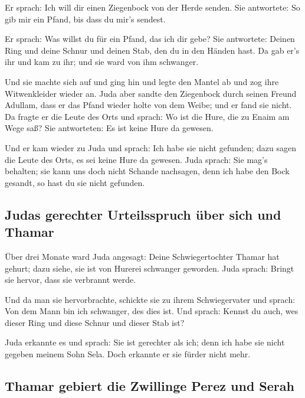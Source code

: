  Er sprach: Ich will dir einen Ziegenbock von der Herde
senden. Sie antwortete: So gib mir ein Pfand, bis dass du mir's sendest.

 Er sprach: Was willst du für ein Pfand, das ich dir
gebe? Sie antwortete: Deinen Ring und deine Schnur und deinen Stab, den
du in den Händen hast. Da gab er's ihr und kam zu ihr; und sie ward von
ihm schwanger.

 Und sie machte sich auf und ging hin und legte den
Mantel ab und zog ihre Witwenkleider wieder an.  Juda
aber sandte den Ziegenbock durch seinen Freund Adullam, dass er das
Pfand wieder holte von dem Weibe; und er fand sie nicht. 
Da fragte er die Leute des Orts und sprach: Wo ist die Hure, die zu
Enaim am Wege saß? Sie antworteten: Es ist keine Hure da gewesen.

 Und er kam wieder zu Juda und sprach: Ich habe sie nicht
gefunden; dazu sagen die Leute des Orts, es sei keine Hure da gewesen.
 Juda sprach: Sie mag's behalten; sie kann uns doch nicht
Schande nachsagen, denn ich habe den Bock gesandt, so hast du sie nicht
gefunden.

\hypertarget{judas-gerechter-urteilsspruch-uxfcber-sich-und-thamar}{%
\subsection{Judas gerechter Urteilsspruch über sich und
Thamar}\label{judas-gerechter-urteilsspruch-uxfcber-sich-und-thamar}}

 Über drei Monate ward Juda angesagt: Deine
Schwiegertochter Thamar hat gehurt; dazu siehe, sie ist von Hurerei
schwanger geworden. Juda sprach: Bringt sie hervor, dass sie verbrannt
werde.

 Und da man sie hervorbrachte, schickte sie zu ihrem
Schwiegervater und sprach: Von dem Mann bin ich schwanger, des dies ist.
Und sprach: Kennst du auch, wes dieser Ring und diese Schnur und dieser
Stab ist?

 Juda erkannte es und sprach: Sie ist gerechter als ich;
denn ich habe sie nicht gegeben meinem Sohn Sela. Doch erkannte er sie
fürder nicht mehr.

\hypertarget{thamar-gebiert-die-zwillinge-perez-und-serah}{%
\subsection{Thamar gebiert die Zwillinge Perez und
Serah}\label{thamar-gebiert-die-zwillinge-perez-und-serah}}

